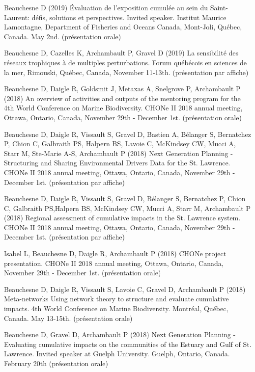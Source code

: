 \begin{singlespace}

Beauchesne D (2019) Évaluation de l’exposition cumulée au sein du Saint-Laurent: défis, solutions et perspectives. Invited speaker. Institut Maurice Lamontagne, Department of Fisheries and Oceans Canada, Mont-Joli, Québec, Canada. May 2nd. (présentation orale)

Beauchesne D, Cazelles K, Archambault P, Gravel D (2019) La sensibilité des réseaux trophiques à de multiples perturbations. Forum québécois en sciences de la mer, Rimouski, Québec, Canada, November 11-13th. (présentation par affiche)

Beauchesne D, Daigle R, Goldsmit J, Metaxas A, Snelgrove P, Archambault P (2018) An overview of activities and outputs of the mentoring program for the 4th World Conference on Marine Biodiversity. CHONe II 2018 annual meeting, Ottawa, Ontario, Canada, November 29th - December 1st. (présentation orale)

Beauchesne D, Daigle R, Vissault S, Gravel D, Bastien A, Bélanger S, Bernatchez P, Chion C, Galbraith PS, Halpern BS, Lavoie C, McKindsey CW, Mucci A, Starr M, Ste-Marie A-S, Archambault P (2018) Next Generation Planning - Structuring and Sharing Environmental Drivers Data for the St. Lawrence. CHONe II 2018 annual meeting, Ottawa, Ontario, Canada, November 29th - December 1st. (présentation par affiche)

Beauchesne D, Daigle R, Vissault S, Gravel D, Bélanger S, Bernatchez P, Chion C, Galbraith PS,Halpern BS, McKindsey CW, Mucci A, Starr M, Archambault P (2018) Regional assessment of cumulative impacts in the St. Lawrence system. CHONe II 2018 annual meeting, Ottawa, Ontario, Canada, November 29th - December 1st. (présentation par affiche)

Isabel L, Beauchesne D, Daigle R, Archambault P (2018) CHONe project presentation. CHONe II 2018 annual meeting, Ottawa, Ontario, Canada, November 29th - December 1st. (présentation orale)

Beauchesne D, Daigle R, Vissault S, Lavoie C, Gravel D, Archambault P (2018) Meta-networks Using network theory to structure and evaluate cumulative impacts. 4th World Conference on Marine Biodiversity. Montréal, Québec, Canada. May 13-15th. (présentation orale)

Beauchesne D, Gravel D, Archambault P (2018) Next Generation Planning - Evaluating cumulative impacts on the communities of the Estuary and Gulf of St. Lawrence. Invited speaker at Guelph University. Guelph, Ontario, Canada. February 20th (présentation orale)


\end{singlespace}
